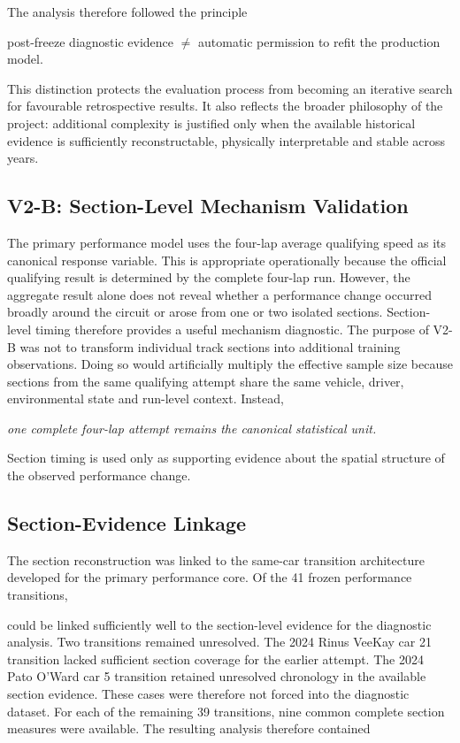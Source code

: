 The analysis therefore followed the principle

post-freeze diagnostic evidence \ensuremath{\neq} automatic permission to refit the production model.

This distinction protects the evaluation process from becoming an iterative search for favourable retrospective results. It also reflects the broader philosophy of the project: additional complexity is justified only when the available historical evidence is sufficiently reconstructable, physically interpretable and stable across years.

\subsection{V2-B: Section-Level Mechanism Validation}
The primary performance model uses the four-lap average qualifying speed as its canonical response variable. This is appropriate operationally because the official qualifying result is determined by the complete four-lap run. However, the aggregate result alone does not reveal whether a performance change occurred broadly around the circuit or arose from one or two isolated sections. Section-level timing therefore provides a useful mechanism diagnostic. The purpose of V2-B was not to transform individual track sections into additional training observations. Doing so would artificially multiply the effective sample size because sections from the same qualifying attempt share the same vehicle, driver, environmental state and run-level context. Instead,

\begin{center}\textit{one complete four-lap attempt remains the canonical statistical unit.}\end{center}

Section timing is used only as supporting evidence about the spatial structure of the observed performance change.

\subsection{Section-Evidence Linkage}
The section reconstruction was linked to the same-car transition architecture developed for the primary performance core. Of the 41 frozen performance transitions,

could be linked sufficiently well to the section-level evidence for the diagnostic analysis. Two transitions remained unresolved. The 2024 Rinus VeeKay car 21 transition lacked sufficient section coverage for the earlier attempt. The 2024 Pato O'Ward car 5 transition retained unresolved chronology in the available section evidence. These cases were therefore not forced into the diagnostic dataset. For each of the remaining 39 transitions, nine common complete section measures were available. The resulting analysis therefore contained

